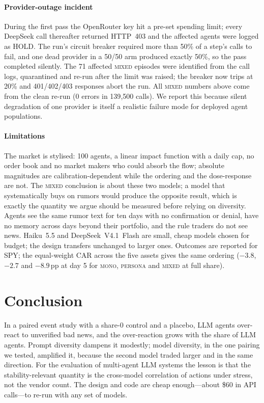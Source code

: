 \documentclass[10pt]{article}
\begin{document}
\paragraph{Provider-outage incident} During the first pass the OpenRouter key hit a pre-set spending limit; every DeepSeek call thereafter returned HTTP~403 and the affected agents were logged as HOLD. The run's circuit breaker required more than 50\% of a step's calls to fail, and one dead provider in a 50/50 arm produced exactly 50\%, so the pass completed silently. The 71 affected \textsc{mixed} episodes were identified from the call logs, quarantined and re-run after the limit was raised; the breaker now trips at 20\% and 401/402/403 responses abort the run. All \textsc{mixed} numbers above come from the clean re-run (0 errors in 139{,}500 calls). We report this because silent degradation of one provider is itself a realistic failure mode for deployed agent populations.

\paragraph{Limitations} The market is stylised: 100 agents, a linear impact function with a daily cap, no order book and no market makers who could absorb the flow; absolute magnitudes are calibration-dependent while the ordering and the dose-response are not. The \textsc{mixed} conclusion is about these two models; a model that systematically buys on rumors would produce the opposite result, which is exactly the quantity we argue should be measured before relying on diversity. Agents see the same rumor text for ten days with no confirmation or denial, have no memory across days beyond their portfolio, and the rule traders do not see news. Haiku~5.5 and DeepSeek~V4.1~Flash are small, cheap models chosen for budget; the design transfers unchanged to larger ones. Outcomes are reported for SPY; the equal-weight CAR across the five assets gives the same ordering ($-3.8$, $-2.7$ and $-8.9$\,pp at day 5 for \textsc{mono}, \textsc{persona} and \textsc{mixed} at full share).

\section{Conclusion}

In a paired event study with a share-0 control and a placebo, LLM agents over-react to unverified bad news, and the over-reaction grows with the share of LLM agents. Prompt diversity dampens it modestly; model diversity, in the one pairing we tested, amplified it, because the second model traded larger and in the same direction. For the evaluation of multi-agent LLM systems the lesson is that the stability-relevant quantity is the cross-model correlation of actions under stress, not the vendor count. The design and code are cheap enough---about \$60 in API calls---to re-run with any set of models.
\end{document}
